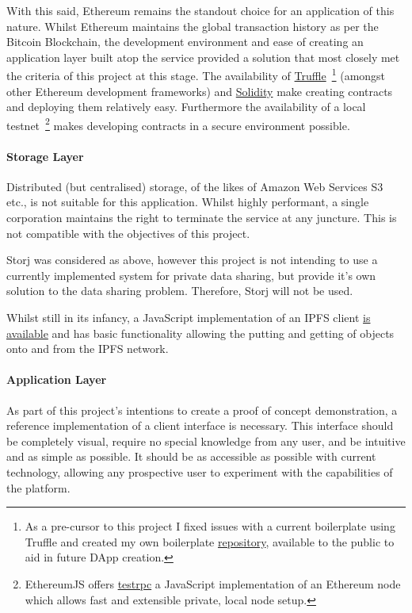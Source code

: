 With this said, Ethereum remains the standout choice for an application of this nature. Whilst Ethereum maintains the global transaction history as per the Bitcoin Blockchain, the development environment and ease of creating an application layer built atop the service provided a solution that most closely met the criteria of this project at this stage. The availability of \href{https://github.com/trufflesuite/truffle}{Truffle}~\footnote{As a pre-cursor to this project I fixed issues with a current boilerplate using Truffle and created my own boilerplate \href{https://github.com/FreddieLindsey/truffle-webpack-boilerplate}{repository}, available to the public to aid in future DApp creation.} (amongst other Ethereum development frameworks) and \href{https://github.com/ethereum/solidity}{Solidity} make creating contracts and deploying them relatively easy. Furthermore the availability of a local testnet~\footnote{EthereumJS offers \href{https://github.com/ethereumjs/testrpc}{testrpc} a JavaScript implementation of an Ethereum node which allows fast and extensible private, local node setup.} makes developing contracts in a secure environment possible.

\paragraph{Storage Layer}

Distributed (but centralised) storage, of the likes of Amazon Web Services S3 etc., is not suitable for this application. Whilst highly performant, a single corporation maintains the right to terminate the service at any juncture. This is not compatible with the objectives of this project.

Storj was considered as above, however this project is not intending to use a currently implemented system for private data sharing, but provide it's own solution to the data sharing problem. Therefore, Storj will not be used.

Whilst still in its infancy, a JavaScript implementation of an IPFS client \href{https://github.com/ipfs/js-ipfs}{is available} and has basic functionality allowing the putting and getting of objects onto and from the IPFS network.

\paragraph{Application Layer}

As part of this project's intentions to create a proof of concept demonstration, a reference implementation of a client interface is necessary. This interface should be completely visual, require no special knowledge from any user, and be intuitive and as simple as possible. It should be as accessible as possible with current technology, allowing any prospective user to experiment with the capabilities of the platform.

